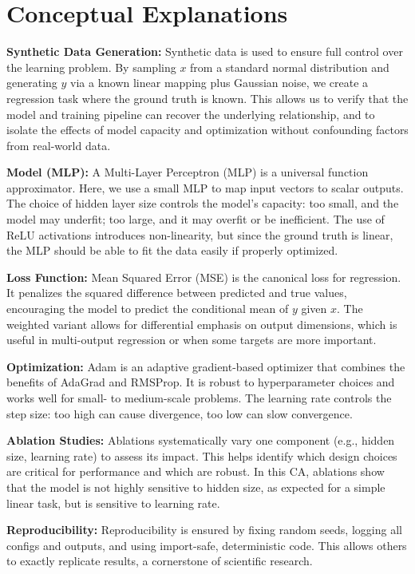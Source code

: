 \documentclass[11pt]{article}
\begin{document}
\section*{Conceptual Explanations}
\textbf{Synthetic Data Generation:} Synthetic data is used to ensure full control over the learning problem. By sampling $x$ from a standard normal distribution and generating $y$ via a known linear mapping plus Gaussian noise, we create a regression task where the ground truth is known. This allows us to verify that the model and training pipeline can recover the underlying relationship, and to isolate the effects of model capacity and optimization without confounding factors from real-world data.

\textbf{Model (MLP):} A Multi-Layer Perceptron (MLP) is a universal function approximator. Here, we use a small MLP to map input vectors to scalar outputs. The choice of hidden layer size controls the model's capacity: too small, and the model may underfit; too large, and it may overfit or be inefficient. The use of ReLU activations introduces non-linearity, but since the ground truth is linear, the MLP should be able to fit the data easily if properly optimized.

\textbf{Loss Function:} Mean Squared Error (MSE) is the canonical loss for regression. It penalizes the squared difference between predicted and true values, encouraging the model to predict the conditional mean of $y$ given $x$. The weighted variant allows for differential emphasis on output dimensions, which is useful in multi-output regression or when some targets are more important.

\textbf{Optimization:} Adam is an adaptive gradient-based optimizer that combines the benefits of AdaGrad and RMSProp. It is robust to hyperparameter choices and works well for small- to medium-scale problems. The learning rate controls the step size: too high can cause divergence, too low can slow convergence.

\textbf{Ablation Studies:} Ablations systematically vary one component (e.g., hidden size, learning rate) to assess its impact. This helps identify which design choices are critical for performance and which are robust. In this CA, ablations show that the model is not highly sensitive to hidden size, as expected for a simple linear task, but is sensitive to learning rate.

\textbf{Reproducibility:} Reproducibility is ensured by fixing random seeds, logging all configs and outputs, and using import-safe, deterministic code. This allows others to exactly replicate results, a cornerstone of scientific research.
\end{document}
